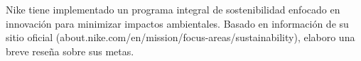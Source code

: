 
%
%
%



\clearpage
{}
Nike tiene implementado un programa integral de sostenibilidad enfocado en innovación para minimizar impactos ambientales. Basado en información de su sitio oficial (about.nike.com/en/mission/focus-areas/sustainability), elaboro una breve reseña sobre sus metas.

